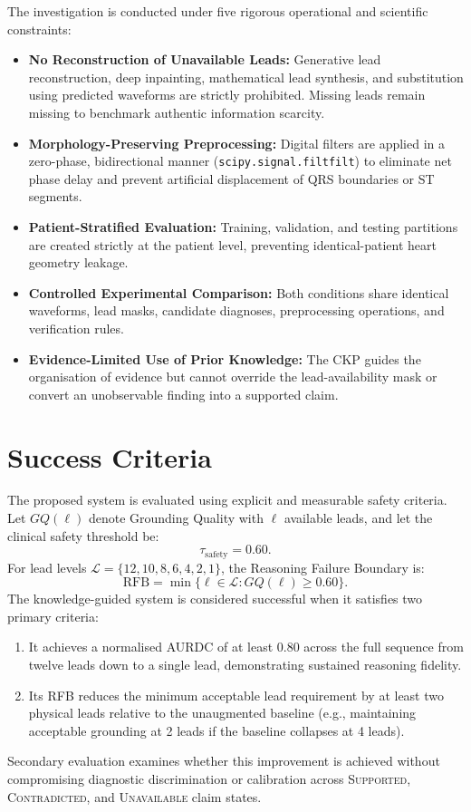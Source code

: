 \documentclass{ssnreview}
\begin{document}
The investigation is conducted under five rigorous operational and scientific constraints:
\begin{itemize}
  \item \textbf{No Reconstruction of Unavailable Leads:} Generative lead reconstruction, deep
  inpainting, mathematical lead synthesis, and substitution using predicted waveforms are
  strictly prohibited. Missing leads remain missing to benchmark authentic information scarcity.
  \item \textbf{Morphology-Preserving Preprocessing:} Digital filters are applied in a
  zero-phase, bidirectional manner (\texttt{scipy.signal.filtfilt}) to eliminate net phase delay
  and prevent artificial displacement of QRS boundaries or ST segments.
  \item \textbf{Patient-Stratified Evaluation:} Training, validation, and testing partitions are
  created strictly at the patient level, preventing identical-patient heart geometry leakage.
  \item \textbf{Controlled Experimental Comparison:} Both conditions share identical waveforms,
  lead masks, candidate diagnoses, preprocessing operations, and verification rules.
  \item \textbf{Evidence-Limited Use of Prior Knowledge:} The CKP guides the organisation of
  evidence but cannot override the lead-availability mask or convert an unobservable finding
  into a supported claim.
\end{itemize}

\section{Success Criteria}

The proposed system is evaluated using explicit and measurable safety criteria. Let
$GQ(\ell)$ denote Grounding Quality with $\ell$ available leads, and let the clinical safety
threshold be:
\begin{equation}
  \tau_{\mathrm{safety}} = 0.60.
\end{equation}
For lead levels $\mathcal{L}=\{12,10,8,6,4,2,1\}$, the Reasoning Failure Boundary is:
\begin{equation}
  \mathrm{RFB}=\min\{\ell\in\mathcal{L}:GQ(\ell)\geq 0.60\}.
\end{equation}
The knowledge-guided system is considered successful when it satisfies two primary criteria:
\begin{enumerate}[label=\arabic*.,leftmargin=*,align=left]
  \item It achieves a normalised AURDC of at least $0.80$ across the full sequence from twelve
  leads down to a single lead, demonstrating sustained reasoning fidelity.
  \item Its RFB reduces the minimum acceptable lead requirement by at least two physical leads
  relative to the unaugmented baseline (e.g., maintaining acceptable grounding at 2 leads if
  the baseline collapses at 4 leads).
\end{enumerate}
Secondary evaluation examines whether this improvement is achieved without compromising
diagnostic discrimination or calibration across \textsc{Supported}, \textsc{Contradicted},
and \textsc{Unavailable} claim states.
\end{document}
